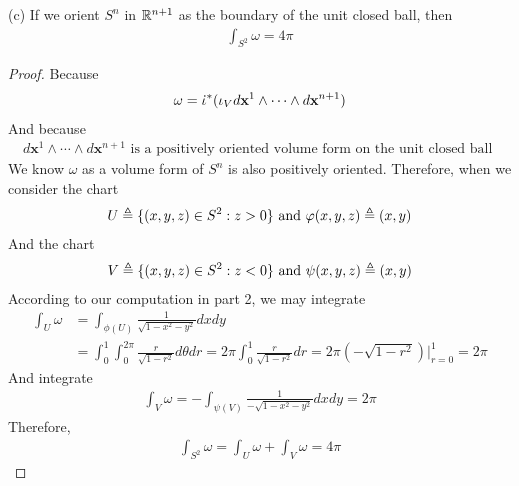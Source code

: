 \documentclass{report}
\begin{document}
\begin{theorem}
  (c) If we orient $S^n$ in  $\mathbb{R}^{n+1}$ as the boundary of the unit closed ball, then 
\begin{align*}
\int_{S^2}\omega =4\pi  
\end{align*}
\end{theorem}
\begin{proof}
Because 
\begin{align*} 
\omega = \dot{\iota}^*(\iota_V d\textbf{x}^1 \wedge  \cdots \wedge  d\textbf{x}^{n+1}   )   
\end{align*}
And because  
\begin{align*}
d\textbf{x}^1 \wedge  \cdots \wedge  d \textbf{x}^{n+1}   \text{ is a positively oriented volume form on the unit closed ball }
\end{align*}
We know $\omega$ as a volume form of $S^n$ is also positively oriented. Therefore, when we consider the chart  
\begin{align*}
U \triangleq \{ (x,y,z)\in S^2:z>0 \}\text{ and } \varphi(x,y,z)\triangleq (x,y)
\end{align*}
And the chart 
\begin{align*}
V\triangleq \{ (x,y,z)\in S^2 :z<0 \}\text{ and }\psi (x,y,z)\triangleq (x,y)
\end{align*}
According to our computation in part 2, we may integrate  
\begin{align*}
\int_U \omega&= \int_{\phi (U)} \frac{1}{\sqrt{1-x^2-y^2} }dxdy \\
&=\int_{0}^1 \int_{0}^{2\pi } \frac{r}{\sqrt{1-r^2} }d\theta dr=2\pi  \int_{0}^1 \frac{r}{\sqrt{1-r^2} }dr= 2\pi  (-\sqrt{1-r^2} )\Big|_{r=0}^1=2\pi 
\end{align*}
And integrate 
\begin{align*}
\int_V \omega= -\int_{\psi (V)} \frac{1}{-\sqrt{1-x^2-y^2} }dxdy= 2\pi 
\end{align*}
Therefore, 
\begin{align*}
\int_{S^2}\omega= \int_U \omega + \int_V \omega = 4\pi 
\end{align*}

\end{proof}
\end{document}
